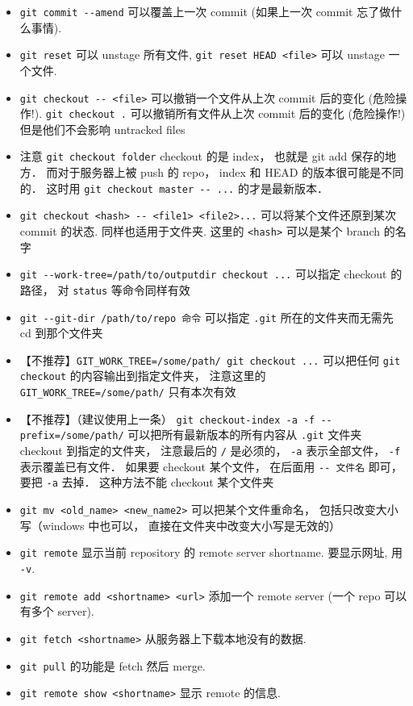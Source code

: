 \begin{itemize}
\item \verb|git commit --amend| 可以覆盖上一次 commit (如果上一次 commit 忘了做什么事情).
\item \verb|git reset| 可以 unstage 所有文件, \verb|git reset HEAD <file>| 可以 unstage 一个文件.
\item \verb|git checkout -- <file>| 可以撤销一个文件从上次 commit 后的变化 (危险操作!). \verb|git checkout .| 可以撤销所有文件从上次 commit 后的变化 (危险操作!) 但是他们不会影响 untracked files
\item 注意 \verb|git checkout folder| checkout 的是 index， 也就是 git add 保存的地方． 而对于服务器上被 push 的 repo， index 和 HEAD 的版本很可能是不同的． 这时用 \verb|git checkout master -- ...| 的才是最新版本．
\item \verb|git checkout <hash> -- <file1> <file2>...| 可以将某个文件还原到某次 commit 的状态. 同样也适用于文件夹. 这里的 \verb|<hash>| 可以是某个 branch 的名字
\item \verb|git --work-tree=/path/to/outputdir checkout ...| 可以指定 checkout 的路径， 对 \verb|status| 等命令同样有效
\item \verb|git --git-dir /path/to/repo 命令| 可以指定 \verb|.git| 所在的文件夹而无需先 cd 到那个文件夹
\item 【不推荐】\verb|GIT_WORK_TREE=/some/path/ git checkout ...| 可以把任何 \verb|git checkout| 的内容输出到指定文件夹， 注意这里的 \verb|GIT_WORK_TREE=/some/path/| 只有本次有效
\item 【不推荐】（建议使用上一条） \verb|git checkout-index -a -f --prefix=/some/path/| 可以把所有最新版本的所有内容从 \verb|.git| 文件夹 checkout 到指定的文件夹， 注意最后的 \verb|/| 是必须的， \verb|-a| 表示全部文件， \verb|-f| 表示覆盖已有文件． 如果要 checkout 某个文件， 在后面用 \verb|-- 文件名| 即可， 要把 \verb|-a| 去掉． 这种方法不能 checkout 某个文件夹
\item \verb|git mv <old_name> <new_name2>| 可以把某个文件重命名， 包括只改变大小写（windows 中也可以， 直接在文件夹中改变大小写是无效的）
\item \verb|git remote| 显示当前 repository 的 remote server shortname. 要显示网址, 用 \verb|-v|.
\item \verb|git remote add <shortname> <url>| 添加一个 remote server (一个 repo 可以有多个 server).
\item \verb|git fetch <shortname>| 从服务器上下载本地没有的数据.
\item \verb|git pull| 的功能是 fetch 然后 merge.
\item \verb|git remote show <shortname>| 显示 remote 的信息.

\end{itemize}
